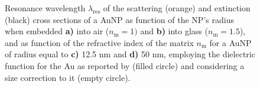 
%
%
%



\begin{figure}
    \hspace*{-3.2em}%
    \vspace*{-3.6em}%
        \begin{subfigure}{.24\textwidth}\caption{ }\label{sfig:red:1}\end{subfigure}%
        \begin{subfigure}{.24\textwidth}\caption{ }\label{sfig:red:2}\end{subfigure}%
        \begin{subfigure}{.25\textwidth}\caption{ }\label{sfig:red:3}\end{subfigure}%
        \begin{subfigure}{.24\textwidth}\caption{ }\label{sfig:red:4}\end{subfigure}%
    \def\svgwidth{\textwidth}
    \small
    \vspace*{0em}
    \caption[Spectral redshift of the scattering and extinction of a spherical AuNP as function of its size and the embedding media]{Resonance wavelength $\lambda_\text{res}$ of the scattering (orange) and extinction (black) cross sections of a AuNP as function of the NP's radius when embedded \textbf{a)} into air ($n_\text{m} = 1)$ and \textbf{b)} into glass ($n_\text{m} = 1.5$), and as function of the refractive index of the matrix  $n_\text{m}$ for a AuNP of radius equal to  \textbf{c)} 12.5 nm and \textbf{d)} 50 nm, employing the dielectric function for the Au as reported by \citeauthor{johnson_optical_1972} (filled circle) and considering a size correction to it (empty circle).}
\end{figure}
